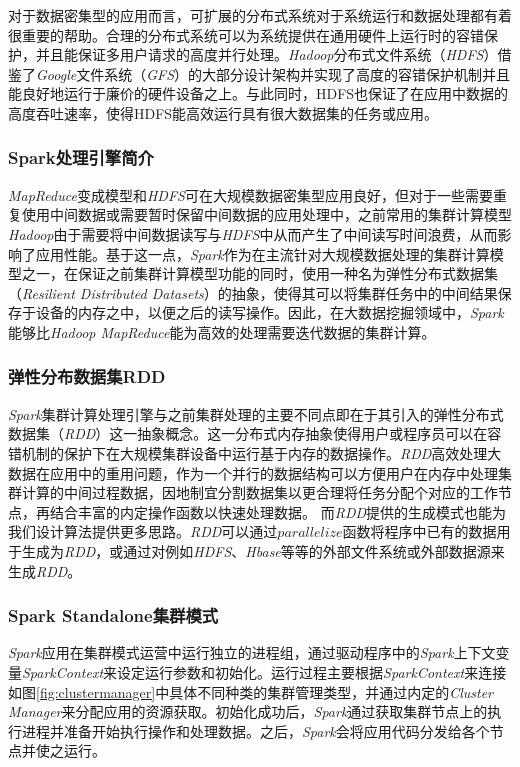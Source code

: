 对于数据密集型的应用而言，可扩展的分布式系统对于系统运行和数据处理都有着很重要的帮助。合理的分布式系统可以为系统提供在通用硬件上运行时的容错保护，并且能保证多用户请求的高度并行处理。\emph{Hadoop}分布式文件系统（\emph{HDFS}）借鉴了\emph{Google}文件系统（\emph{GFS}）的大部分设计架构并实现了高度的容错保护机制并且能良好地运行于廉价的硬件设备之上。与此同时，HDFS也保证了在应用中数据的高度吞吐速率，使得HDFS能高效运行具有很大数据集的任务或应用。

\subsubsection{Spark处理引擎简介}
\label{subsubsec:spark}
\emph{MapReduce}变成模型和\emph{HDFS}可在大规模数据密集型应用良好，但对于一些需要重复使用中间数据或需要暂时保留中间数据的应用处理中，之前常用的集群计算模型\emph{Hadoop}由于需要将中间数据读写与\emph{HDFS}中从而产生了中间读写时间浪费，从而影响了应用性能。基于这一点，\emph{Spark}\cite{zaharia2010spark}作为在主流针对大规模数据处理的集群计算模型之一，在保证之前集群计算模型功能的同时，使用一种名为弹性分布式数据集（\emph{Resilient Distributed Datasets}）的抽象，使得其可以将集群任务中的中间结果保存于设备的内存之中，以便之后的读写操作。因此，在大数据挖掘领域中，\emph{Spark}能够比\emph{Hadoop MapReduce}能为高效的处理需要迭代数据的集群计算。

\subsubsection{弹性分布数据集RDD}
\label{subsubsec:rdd}
\emph{Spark}集群计算处理引擎与之前集群处理的主要不同点即在于其引入的弹性分布式数据集（\emph{RDD}）这一抽象概念。这一分布式内存抽象使得用户或程序员可以在容错机制的保护下在大规模集群设备中运行基于内存的数据操作。\emph{RDD}高效处理大数据在应用中的重用问题，作为一个并行的数据结构可以方便用户在内存中处理集群计算的中间过程数据，因地制宜分割数据集以更合理将任务分配个对应的工作节点，再结合丰富的内定操作函数以快速处理数据。
而\emph{RDD}提供的生成模式也能为我们设计算法提供更多思路。\emph{RDD}可以通过$parallelize$函数将程序中已有的数据用于生成为\emph{RDD}，或通过对例如\emph{HDFS}、\emph{Hbase}等等的外部文件系统或外部数据源来生成\emph{RDD}。

\subsubsection{Spark Standalone集群模式}
\label{subsubsec:standalone}
\emph{Spark}应用在集群模式运营中运行独立的进程组，通过驱动程序中的\emph{Spark}上下文变量\emph{SparkContext}来设定运行参数和初始化。运行过程主要根据\emph{SparkContext}来连接如图\ref{fig:clustermanager}中具体不同种类的集群管理类型，并通过内定的\emph{Cluster Manager}来分配应用的资源获取。初始化成功后，\emph{Spark}通过获取集群节点上的执行进程并准备开始执行操作和处理数据。之后，\emph{Spark}会将应用代码分发给各个节点并使之运行。

